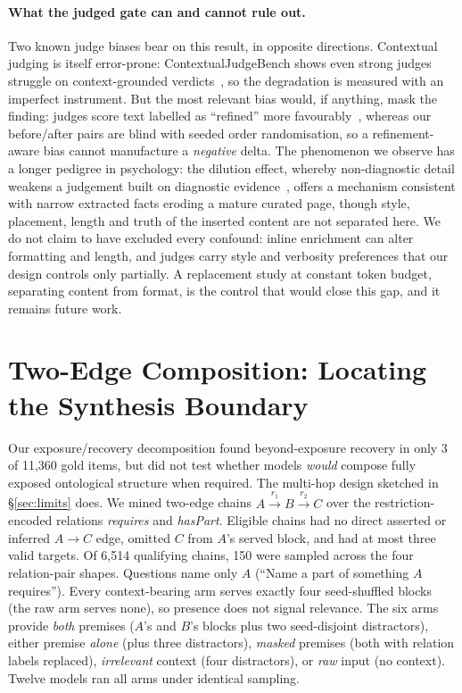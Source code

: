 \documentclass[10pt,twocolumn]{article}
\begin{document}
\paragraph{What the judged gate can and cannot rule out.} Two known judge biases bear on this result, in opposite directions. Contextual judging is itself error-prone: ContextualJudgeBench shows even strong judges struggle on context-grounded verdicts~\cite{contextualjudgebench2025}, so the degradation is measured with an imperfect instrument. But the most relevant bias would, if anything, mask the finding: judges score text labelled as ``refined'' more favourably~\cite{calmjudgebias2024}, whereas our before/after pairs are blind with seeded order randomisation, so a refinement-aware bias cannot manufacture a \emph{negative} delta. The phenomenon we observe has a longer pedigree in psychology: the dilution effect, whereby non-diagnostic detail weakens a judgement built on diagnostic evidence~\cite{nisbett1981dilution}, offers a mechanism consistent with narrow extracted facts eroding a mature curated page, though style, placement, length and truth of the inserted content are not separated here. We do not claim to have excluded every confound: inline enrichment can alter formatting and length, and judges carry style and verbosity preferences that our design controls only partially. A replacement study at constant token budget, separating content from format, is the control that would close this gap, and it remains future work.

\section{Two-Edge Composition: Locating the Synthesis Boundary}\label{sec:composition}
Our exposure/recovery decomposition found beyond-exposure recovery in only 3 of 11{,}360
gold items, but did not test whether models \emph{would} compose fully exposed ontological
structure when required. The multi-hop design sketched in \S\ref{sec:limits} does. We mined
two-edge chains $A\!\xrightarrow{r_1}\!B\!\xrightarrow{r_2}\!C$ over the restriction-encoded
relations \emph{requires} and \emph{hasPart}. Eligible chains had no direct asserted or inferred
$A\!\to\!C$ edge, omitted $C$ from $A$'s served block, and had at most three valid targets.
Of 6{,}514 qualifying chains, 150 were sampled across the four relation-pair shapes. Questions
name only $A$ (``Name a part of something $A$ requires''). Every context-bearing arm serves
exactly four seed-shuffled blocks (the raw arm serves none), so presence does not signal relevance. The six arms provide \emph{both}
premises ($A$'s and $B$'s blocks plus two seed-disjoint distractors), either premise
\emph{alone} (plus three distractors), \emph{masked} premises (both with relation labels
replaced), \emph{irrelevant} context (four distractors), or \emph{raw} input (no context).
Twelve models ran all arms under identical sampling.
\end{document}
